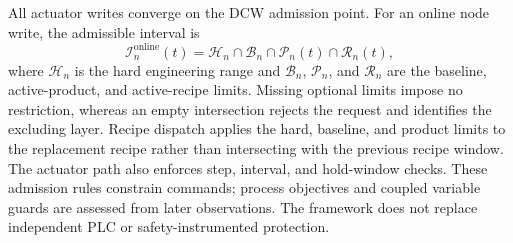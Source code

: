 All actuator writes converge on the DCW admission point. For an online node
write, the admissible interval is
\begin{equation}
\mathcal{I}^{\mathrm{online}}_n(t)=\mathcal{H}_n\cap\mathcal{B}_n
\cap\mathcal{P}_n(t)\cap\mathcal{R}_n(t),
\label{eq:admission}
\end{equation}
where $\mathcal{H}_n$ is the hard engineering range and $\mathcal{B}_n$,
$\mathcal{P}_n$, and $\mathcal{R}_n$ are the baseline, active-product, and
active-recipe limits. Missing optional limits impose no restriction, whereas
an empty intersection rejects the request and identifies the excluding
layer. Recipe dispatch applies the hard, baseline, and product limits to the
replacement recipe rather than intersecting with the previous recipe window.
The actuator path also enforces step, interval, and hold-window checks.
These admission rules constrain commands; process objectives and coupled
variable guards are assessed from later observations. The framework does
not replace independent PLC or safety-instrumented protection.

